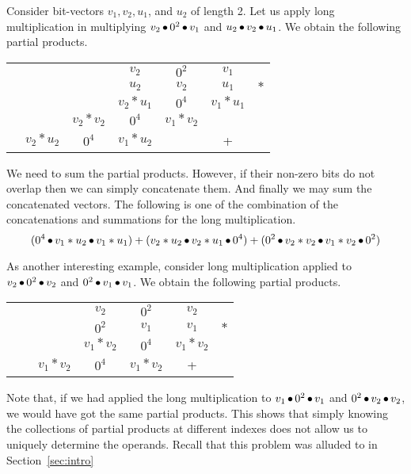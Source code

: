 \begin{example}
  Consider bit-vectors $v_1,v_2,u_1$, and $u_2$ of length 2.
  Let us apply long multiplication in multiplying
  $v_2 \mathop{\bullet} 0^2 \mathop{\bullet} v_1$ and $u_2 \mathop{\bullet} v_2 \mathop{\bullet} u_1$.
  We obtain the following partial products.
\begin{center}
\begin{tabular}{c@{\quad}c@{\quad}c@{\quad}c@{\quad}c@{\quad}c@{\quad}c}
  &&& $v_2$ & $0^2$ & $v_1$&\\ 
  &&& $u_2$ & $v_2$ & $u_1$&$*$\\ \hline
  &&&$v_2*u_1$& $0^4$ & $v_1*u_1$&\\
  &&$v_2*v_2$&$0^4$& $v_1*v_2$ && \\
  &$v_2*u_2$& $0^4$ &$v_1*u_2$&  & +&\\\hline
\end{tabular}
\end{center}
We need to sum the partial products. However, if their non-zero bits 
do not overlap then we can simply concatenate them.
%
And finally we may sum the concatenated vectors.
%
The following is one of the combination of the concatenations and 
summations for the long multiplication.
$$
( 0^4 \mathop{\bullet} v_1*u_2 \mathop{\bullet} v_1*u_1) +
(v_2*u_2 \mathop{\bullet} v_2*u_1 \mathop{\bullet} 0^4) +
(0^2 \mathop{\bullet} v_2*v_2 \mathop{\bullet} v_1*v_2 \mathop{\bullet} 0^2)
$$
\end{example}


\begin{example}

  As another interesting example, consider long multiplication applied to 
  $v_2 \mathop{\bullet} 0^2 \mathop{\bullet} v_2$ and $0^2 \mathop{\bullet} v_1 \mathop{\bullet} v_1$.
  We obtain the following partial products.
\begin{center}
\begin{tabular}{c@{\quad}c@{\quad}c@{\quad}c@{\quad}c@{\quad}c@{\quad}c}
  &&& $v_2$ & $0^2$ & $v_2$&\\ 
  &&& $0^2$ & $v_1$ & $v_1$&$*$\\ \hline
  &&&$v_1*v_2$& $0^4$ & $v_1*v_2$&\\
  &&$v_1*v_2$&$0^4$& $v_1*v_2$ &+&\\\hline
\end{tabular}
\end{center}


Note that, if we had applied the long multiplication to $v_1 \mathop{\bullet}
0^2 \mathop{\bullet} v_1$ and $0^2 \mathop{\bullet} v_2 \mathop{\bullet} v_2$, we would have got
the same partial products. This shows that simply knowing the
collections of partial products at different indexes does not allow us
to uniquely determine the operands. Recall that this problem was
alluded to in Section~\ref{sec:intro}

\end{example}


